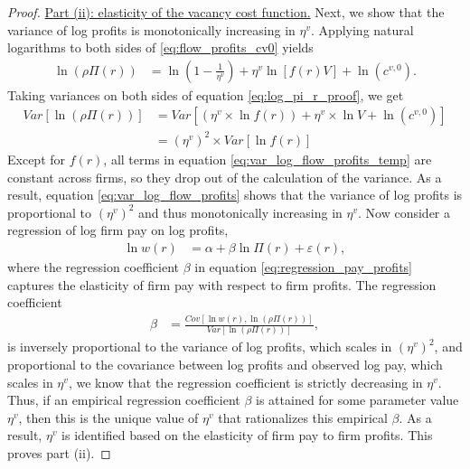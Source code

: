 \begin{proof}
    \uline{Part (ii): elasticity of the vacancy cost function.} %
    Next, we show that the variance of log profits is monotonically increasing in $\eta^{v}$. Applying natural logarithms to both sides of \eqref{eq:flow_profits_cv0} yields
    \begin{align}
        \ln (\rho \Pi(r)) & = \ln \left(1 - \frac{1}{\eta^{v}} \right) + \eta^{v} \ln [f(r) V] + \ln(c^{v,0}). \label{eq:log_pi_r_proof}
    \end{align}
    Taking variances on both sides of equation \eqref{eq:log_pi_r_proof}, we get
    \begin{align}
        Var\left[\ln (\rho \Pi(r)) \right] %
        & =Var \left[\left(\eta^{v} \times\ln f(r) \right)+ \eta^{v} \times \ln V + \ln\left(c^{v,0} \right) \right] \label{eq:var_log_flow_profits_temp} \\
        & =\left(\eta^{v}\right)^{2}\times Var\left[\ln f(r)\right] \label{eq:var_log_flow_profits}
    \end{align}
    Except for $f(r)$, all terms in equation \eqref{eq:var_log_flow_profits_temp} are constant across firms, so they drop out of the calculation of the variance. As a result, equation \eqref{eq:var_log_flow_profits} shows that the variance of log profits is proportional to $(\eta^{v})^2$ and thus monotonically increasing in $\eta^{v}$. Now consider a regression of log firm pay on log profits,
    \begin{align}
        \ln w(r) &= \alpha + \beta \ln \Pi(r) + \varepsilon(r),\label{eq:regression_pay_profits}
    \end{align}
    where the regression coefficient $\beta$ in equation \eqref{eq:regression_pay_profits} captures the elasticity of firm pay with respect to firm profits. The regression coefficient
    \begin{align}
        \beta &= \frac{Cov[ \ln w(r), \ln (\rho \Pi(r)) ]}{Var[ \ln (\rho \Pi(r)) ]}, \label{eq:regression_beta}
    \end{align}
    is inversely proportional to the variance of log profits, which scales in $(\eta^{v})^2$, and proportional to the covariance between log profits and observed log pay, which scales in $\eta^{v}$, we know that the regression coefficient is strictly decreasing in $\eta^{v}$. Thus, if an empirical regression coefficient $\beta$ is attained for some parameter value $\eta^{v}$, then this is the unique value of $\eta^{v}$ that rationalizes this empirical $\beta$. As a result, $\eta^{v}$ is identified based on the elasticity of firm pay to firm profits. This proves part (ii).


\end{proof}
